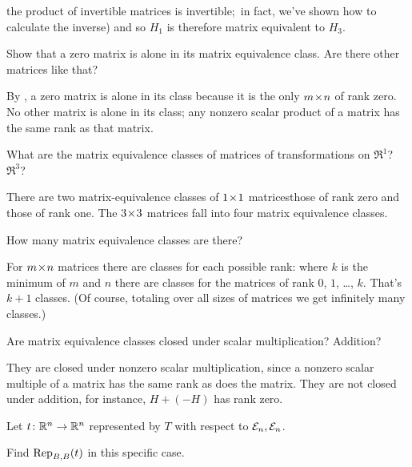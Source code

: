 \begin{exercises}
\begin{answer}
      the product of invertible matrices is invertible;~in fact, we've shown
      how to calculate the inverse) and so \( H_1 \) is therefore
      matrix equivalent to \( H_3 \).  
     \end{answer}
  \recommended \item 
    Show that a zero matrix is alone in its matrix equivalence
    class.
    Are there other matrices like that?
    \begin{answer}
      By , a zero matrix is alone 
      in its class because it is the only \( \nbym{m}{n} \) of rank zero.
      No other matrix is alone in its class; 
      any nonzero scalar product of a matrix
      has the same rank as that matrix.  
    \end{answer}
  \item 
    What are the matrix equivalence classes of matrices of
    transformations on \( \Re^1 \)?
    \( \Re^3 \)?
    \begin{answer}
      There are two matrix-equivalence classes of \( \nbyn{1} \)
      matrices\Dash those of rank zero and those of rank one.
      The  \( \nbyn{3} \) matrices fall into four matrix equivalence
      classes.
    \end{answer}
  \item 
    How many matrix equivalence classes are there?
    \begin{answer}
      For \( \nbym{m}{n} \) matrices there are classes for each possible
      rank: where \( k \)  is the minimum of \( m \) and \( n \) there are
      classes for the matrices of rank \( 0 \), \( 1 \), \ldots, \( k \).
      That's \( k+1 \) classes.  
      (Of course, totaling over all sizes of matrices we get infinitely
      many classes.)
    \end{answer}
  \item 
    Are matrix equivalence classes closed under scalar
    multiplication?
    Addition?
    \begin{answer}
      They are closed under nonzero scalar multiplication, since
      a nonzero scalar multiple of a matrix has the same rank as does the
      matrix.
      They are not closed under addition,
      for instance, \( H+(-H) \) has rank zero.  
    \end{answer}
  \item 
    Let \( \map{t}{\Re^n}{\Re^n} \) represented by
    \( T \) with respect to \( \stdbasis_n,\stdbasis_n \).
    \begin{exparts}
      \partsitem Find $\rep{t}{B,B}$ in this specific case.

\end{exparts}
\end{exercises}
